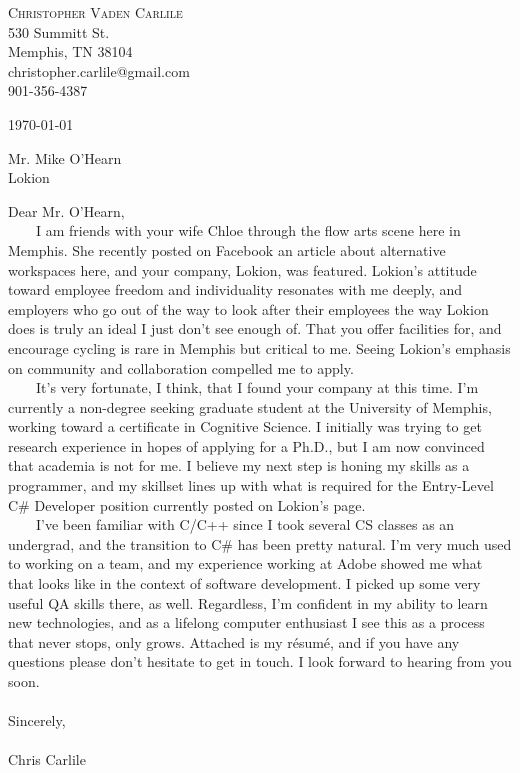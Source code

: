 \documentclass[9pt]{article}
\begin{document}
{ \center
{\Large \textsc{Christopher Vaden Carlile}} \\
530 Summitt St. \\
Memphis, TN 38104 \\
christopher.carlile@gmail.com \\
901-356-4387 \\ \bigskip{}
}

{ \raggedright
\today
\bigskip{}

Mr. Mike O'Hearn \\
Lokion \\
\bigskip

Dear Mr. O'Hearn, \\ 
\ \ \ \ I am friends with your wife Chloe through the flow arts scene here in Memphis. She recently posted on Facebook an article about alternative workspaces here, and your company, Lokion, was featured. Lokion's attitude toward employee freedom and individuality resonates with me deeply, and employers who go out of the way to look after their employees the way Lokion does is truly an ideal I just don't see enough of. That you offer facilities for, and encourage cycling is rare in Memphis but critical to me. Seeing Lokion's emphasis on community and collaboration compelled me to apply. \\
\ \ \ \ It's very fortunate, I think, that I found your company at this time. I'm currently a non-degree seeking graduate student at the University of Memphis, working toward a certificate in Cognitive Science. I initially was trying to get research experience in hopes of applying for a Ph.D., but I am now convinced that academia is not for me. I believe my next step is honing my skills as a programmer, and my skillset lines up with what is required for the Entry-Level C\# Developer position currently posted on Lokion's page. \\
\ \ \ \ I've been familiar with C/C++ since I took several CS classes as an undergrad, and the transition to C\# has been pretty natural. I'm very much used to working on a team, and my experience working at Adobe showed me what that looks like in the context of software development. I picked up some very useful QA skills there, as well. Regardless, I'm confident in my ability to learn new technologies, and as a lifelong computer enthusiast I see this as a process that never stops, only grows. Attached is my r\'{e}sum\'{e, and if you have any questions please don't hesitate to get in touch. I look forward to hearing from you soon.
}
{
 \\
\bigskip{} \\
Sincerely, \\
\bigskip{} \\
Chris Carlile
}

}
\end{document}
